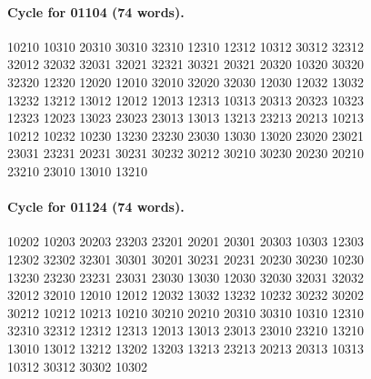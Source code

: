 \documentclass[11pt]{article}
\theoremstyle{remark}
\numberwithin{equation}{section}
\begin{document}
\paragraph{Cycle for 01104 (74 words).}
\begingroup\footnotesize\ttfamily\begin{flushleft}
10210 10310 20310 30310 32310 12310 12312 10312 30312 32312\\
32012 32032 32031 32021 32321 30321 20321 20320 10320 30320\\
32320 12320 12020 12010 32010 32020 32030 12030 12032 13032\\
13232 13212 13012 12012 12013 12313 10313 20313 20323 10323\\
12323 12023 13023 23023 23013 13013 13213 23213 20213 10213\\
10212 10232 10230 13230 23230 23030 13030 13020 23020 23021\\
23031 23231 20231 30231 30232 30212 30210 30230 20230 20210\\
23210 23010 13010 13210\\
\end{flushleft}\endgroup
\paragraph{Cycle for 01124 (74 words).}
\begingroup\footnotesize\ttfamily\begin{flushleft}
10202 10203 20203 23203 23201 20201 20301 20303 10303 12303\\
12302 32302 32301 30301 30201 30231 20231 20230 30230 10230\\
13230 23230 23231 23031 23030 13030 12030 32030 32031 32032\\
32012 32010 12010 12012 12032 13032 13232 10232 30232 30202\\
30212 10212 10213 10210 30210 20210 20310 30310 10310 12310\\
32310 32312 12312 12313 12013 13013 23013 23010 23210 13210\\
13010 13012 13212 13202 13203 13213 23213 20213 20313 10313\\
10312 30312 30302 10302\\
\end{flushleft}\endgroup
\end{document}
